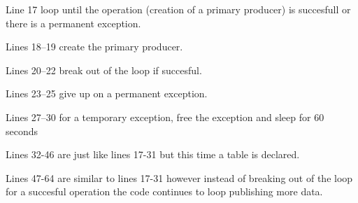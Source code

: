 

Line 17 loop until the operation (creation of a primary producer) is succesfull
or there is a permanent exception. 

Lines 18--19 create the primary producer.

Lines 20--22 break out of the loop if succesful.

Lines 23--25 give up on a permanent exception.

Lines 27--30 for a temporary exception, free the exception and sleep for 60
seconds

Lines 32-46 are just like lines 17-31 but this time a table is declared.

Lines 47-64 are similar to lines 17-31 however instead of breaking out of the
loop for a succesful operation the code continues to loop publishing more data.
